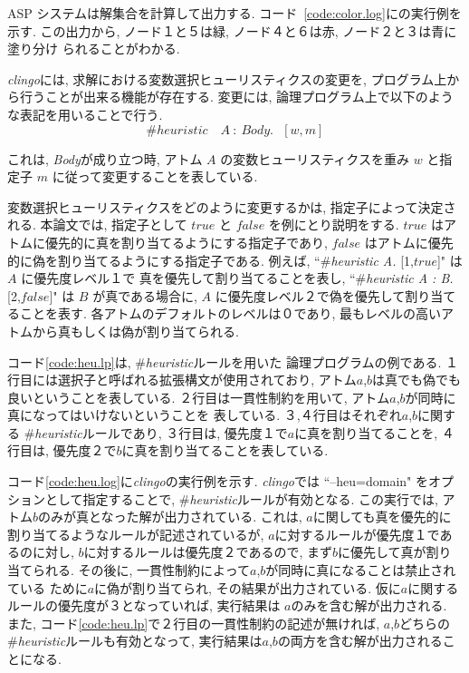 ASP システムは解集合を計算して出力する. 
コード~\ref{code:color.log}に{\clingo}の実行例を示す. 
この出力から, ノード１と５は緑, ノード４と６は赤, ノード２と３は青に塗り分け
られることがわかる. 

\textit{clingo}には, 求解における変数選択ヒューリスティクスの変更を, 
プログラム上から行うことが出来る機能が存在する. 
変更には, 論理プログラム上で以下のような表記を用いることで行う. 
\begin{displaymath}
\#heuristic \quad A~ : ~Body. ~~~[w,m]
\end{displaymath}

これは, \textit{Body}が成り立つ時, アトム $A$ の変数ヒューリスティクスを重み
 $w$ と指定子 $m$ に従って変更することを表している. 

変数選択ヒューリスティクスをどのように変更するかは, 指定子によって決定される. 
本論文では, 指定子として $true$ と $false$ を例にとり説明をする. 
$true$ はアトムに優先的に真を割り当てるようにする指定子であり, 
$false$ はアトムに優先的に偽を割り当てるようにする指定子である. 
例えば, ``\#\textit{heuristic A.} [1,$true$]" は $A$ に優先度レベル１で
真を優先して割り当てることを表し, 
``\#\textit{heuristic A : B.} [2,$false$]" は $B$ が真である場合に, 
$A$ に優先度レベル２で偽を優先して割り当てることを表す. 
各アトムのデフォルトのレベルは０であり, 
最もレベルの高いアトムから真もしくは偽が割り当てられる. 

コード\ref{code:heu.lp}は, \#\textit{heuristic}ルールを用いた
論理プログラムの例である. 
１行目には選択子と呼ばれる拡張構文が使用されており, 
アトム$a$,$b$は真でも偽でも良いということを表している. 
２行目は一貫性制約を用いて, 
アトム$a$,$b$が同時に真になってはいけないということを
表している.  
３,４行目はそれぞれ$a$,$b$に関する
\#\textit{heuristic}ルールであり, 
３行目は, 優先度１で$a$に真を割り当てることを, 
４行目は, 優先度２で$b$に真を割り当てることを表している. 

コード\ref{code:heu.log}に\textit{clingo}の実行例を示す. 
\textit{clingo}では ``--heu=domain" をオプションとして指定することで, 
\#\textit{heuristic}ルールが有効となる. 
この実行では, アトム$b$のみが真となった解が出力されている. 
これは, $a$に関しても真を優先的に割り当てるようなルールが記述されているが, 
$a$に対するルールが優先度１であるのに対し, $b$に対するルールは優先度２であるので, 
まず$b$に優先して真が割り当てられる. 
その後に, 一貫性制約によって$a$,$b$が同時に真になることは禁止されている
ために$a$に偽が割り当てられ, その結果が出力されている. 
仮に$a$に関するルールの優先度が３となっていれば, 実行結果は
$a$のみを含む解が出力される. 
また, コード\ref{code:heu.lp}で２行目の一貫性制約の記述が無ければ, 
$a$,$b$どちらの\#\textit{heuristic}ルールも有効となって, 
実行結果は$a$,$b$の両方を含む解が出力されることになる. 


